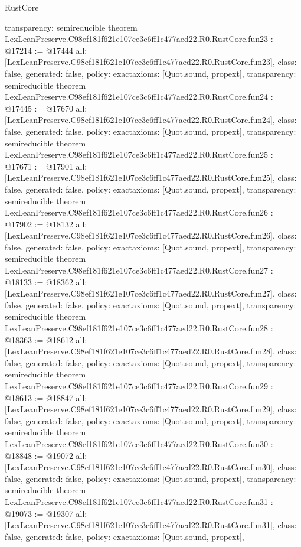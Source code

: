 \begin{lexlean}{RustCore}
\begin{coremodule}
{  transparency: semireducible
}
theorem LexLeanPreserve.C98ef181f621e107ce3c6ff1c477aed22.R0.RustCore.fun23 : @17214 := @17444 {
  all: [LexLeanPreserve.C98ef181f621e107ce3c6ff1c477aed22.R0.RustCore.fun23],
  class: false,
  generated: false,
  policy: exact{axioms: [Quot.sound, propext]},
  transparency: semireducible
}
theorem LexLeanPreserve.C98ef181f621e107ce3c6ff1c477aed22.R0.RustCore.fun24 : @17445 := @17670 {
  all: [LexLeanPreserve.C98ef181f621e107ce3c6ff1c477aed22.R0.RustCore.fun24],
  class: false,
  generated: false,
  policy: exact{axioms: [Quot.sound, propext]},
  transparency: semireducible
}
theorem LexLeanPreserve.C98ef181f621e107ce3c6ff1c477aed22.R0.RustCore.fun25 : @17671 := @17901 {
  all: [LexLeanPreserve.C98ef181f621e107ce3c6ff1c477aed22.R0.RustCore.fun25],
  class: false,
  generated: false,
  policy: exact{axioms: [Quot.sound, propext]},
  transparency: semireducible
}
theorem LexLeanPreserve.C98ef181f621e107ce3c6ff1c477aed22.R0.RustCore.fun26 : @17902 := @18132 {
  all: [LexLeanPreserve.C98ef181f621e107ce3c6ff1c477aed22.R0.RustCore.fun26],
  class: false,
  generated: false,
  policy: exact{axioms: [Quot.sound, propext]},
  transparency: semireducible
}
theorem LexLeanPreserve.C98ef181f621e107ce3c6ff1c477aed22.R0.RustCore.fun27 : @18133 := @18362 {
  all: [LexLeanPreserve.C98ef181f621e107ce3c6ff1c477aed22.R0.RustCore.fun27],
  class: false,
  generated: false,
  policy: exact{axioms: [Quot.sound, propext]},
  transparency: semireducible
}
theorem LexLeanPreserve.C98ef181f621e107ce3c6ff1c477aed22.R0.RustCore.fun28 : @18363 := @18612 {
  all: [LexLeanPreserve.C98ef181f621e107ce3c6ff1c477aed22.R0.RustCore.fun28],
  class: false,
  generated: false,
  policy: exact{axioms: [Quot.sound, propext]},
  transparency: semireducible
}
theorem LexLeanPreserve.C98ef181f621e107ce3c6ff1c477aed22.R0.RustCore.fun29 : @18613 := @18847 {
  all: [LexLeanPreserve.C98ef181f621e107ce3c6ff1c477aed22.R0.RustCore.fun29],
  class: false,
  generated: false,
  policy: exact{axioms: [Quot.sound, propext]},
  transparency: semireducible
}
theorem LexLeanPreserve.C98ef181f621e107ce3c6ff1c477aed22.R0.RustCore.fun30 : @18848 := @19072 {
  all: [LexLeanPreserve.C98ef181f621e107ce3c6ff1c477aed22.R0.RustCore.fun30],
  class: false,
  generated: false,
  policy: exact{axioms: [Quot.sound, propext]},
  transparency: semireducible
}
theorem LexLeanPreserve.C98ef181f621e107ce3c6ff1c477aed22.R0.RustCore.fun31 : @19073 := @19307 {
  all: [LexLeanPreserve.C98ef181f621e107ce3c6ff1c477aed22.R0.RustCore.fun31],
  class: false,
  generated: false,
  policy: exact{axioms: [Quot.sound, propext]},
}
\end{coremodule}
\end{lexlean}

